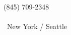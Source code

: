 \documentclass[]{hieudo-build}
\begin{document}
\begin{minipage}[t]{0.62\textwidth}
\end{minipage} 
%
%
    

\hfill


%
%
{
	\phone \hspace{0.1mm} (845) 709-2348\\
	\\
    \ {New York / Seattle}\\
}
    
\end{document}
